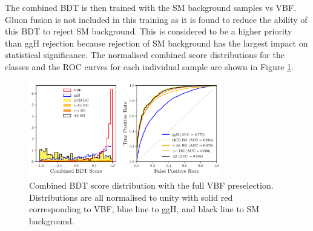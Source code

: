The combined BDT is then trained with the SM background samples vs VBF. Gluon fusion is not included in this training as it is found to reduce the ability of this BDT to reject SM background. This is considered to be a higher priority than ggH rejection because rejection of SM background has the largest impact on statistical significance. 
The normalised combined score distributions for the classes and the ROC curves for each individual sample are shown in Figure \ref{fig:event_categorisaton:combined_bdt_performance}.
\begin{figure}[h!]
    \begin{center}
        \includegraphics[width=0.75\textwidth]{figures/event_selection/combined_BDT_PS.pdf}
    \end{center}
    \caption{Combined BDT score distribution with the full VBF preselection. Distributions are all normalised to unity with solid red corresponding to VBF, blue line to ggH, and black line to SM background.}
    \label{fig:event_categorisaton:combined_bdt_performance}
\end{figure}



